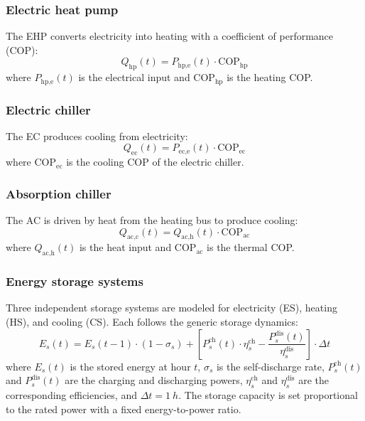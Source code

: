 \subsubsection{Electric heat pump}

The EHP converts electricity into heating with a coefficient of performance (COP):
\begin{equation}
    Q_{\text{hp}}(t) = P_{\text{hp,e}}(t) \cdot \text{COP}_{\text{hp}}
    \label{eq:hp}
\end{equation}
where $P_{\text{hp,e}}(t)$ is the electrical input and $\text{COP}_{\text{hp}}$ is the heating COP.

\subsubsection{Electric chiller}

The EC produces cooling from electricity:
\begin{equation}
    Q_{\text{ec}}(t) = P_{\text{ec,e}}(t) \cdot \text{COP}_{\text{ec}}
    \label{eq:ec}
\end{equation}
where $\text{COP}_{\text{ec}}$ is the cooling COP of the electric chiller.

\subsubsection{Absorption chiller}

The AC is driven by heat from the heating bus to produce cooling:
\begin{equation}
    Q_{\text{ac,c}}(t) = Q_{\text{ac,h}}(t) \cdot \text{COP}_{\text{ac}}
    \label{eq:ac}
\end{equation}
where $Q_{\text{ac,h}}(t)$ is the heat input and $\text{COP}_{\text{ac}}$ is the thermal COP.

\subsubsection{Energy storage systems}

Three independent storage systems are modeled for electricity (ES), heating (HS), and cooling (CS). Each follows the generic storage dynamics:
\begin{equation}
    E_s(t) = E_s(t-1) \cdot (1 - \sigma_s) + \left[ P_s^{\text{ch}}(t) \cdot \eta_s^{\text{ch}} - \frac{P_s^{\text{dis}}(t)}{\eta_s^{\text{dis}}} \right] \cdot \Delta t
    \label{eq:storage}
\end{equation}
where $E_s(t)$ is the stored energy at hour $t$, $\sigma_s$ is the self-discharge rate, $P_s^{\text{ch}}(t)$ and $P_s^{\text{dis}}(t)$ are the charging and discharging powers, $\eta_s^{\text{ch}}$ and $\eta_s^{\text{dis}}$ are the corresponding efficiencies, and $\Delta t = \SI{1}{h}$. The storage capacity is set proportional to the rated power with a fixed energy-to-power ratio.

